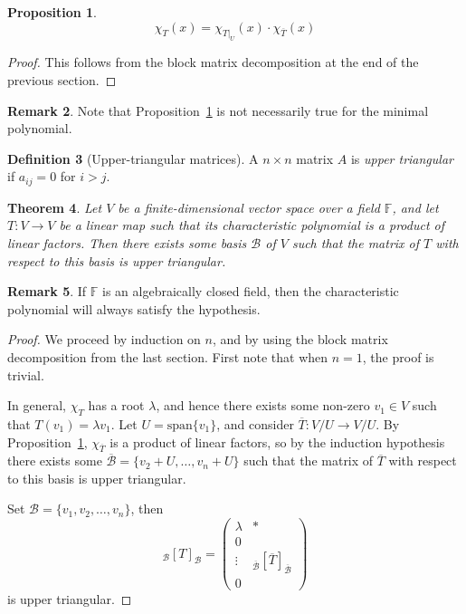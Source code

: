 \documentclass[10pt,fleqn]{article}
\newcommand{\spa}{\mathrm{span}}
\newcommand{\field}{\mathbb{F}}
\newcommand{\basis}{\mathcal{B}}
\theoremstyle{definition} \newtheorem{defn}{Definition}[section]
\theoremstyle{plain}      \newtheorem{thm}[defn]{Theorem}
\theoremstyle{plain}      \newtheorem{prop}[defn]{Proposition}
\theoremstyle{plain}      \newtheorem{lem}[defn]{Lemma}
\theoremstyle{plain}      \newtheorem{cor}[defn]{Corollary}
\theoremstyle{plain}      \newtheorem{ad}[defn]{Addendum}
\theoremstyle{definition} \newtheorem{ex}[defn]{Example}
\theoremstyle{definition} \newtheorem{rem}[defn]{Remark}
\numberwithin{equation}{subsection}
\begin{document}
\begin{prop}\label{char-pol-prod}
    \[
        \chi_T(x)=
        \chi_{T|_U}(x)\cdot\chi_{\overline{T}}(x)
    \]
\end{prop}

\begin{proof}
    This follows from the block matrix decomposition at the end of the previous section.
\end{proof}

\begin{rem}
    Note that Proposition~\ref{char-pol-prod} is not necessarily true for the minimal polynomial.
\end{rem}

\begin{defn}[Upper-triangular matrices]
    A $n\times n$ matrix $A$ is \emph{upper triangular} if $a_{ij}=0$ for $i>j$. 
\end{defn}

\begin{thm}\label{upp-tri-thm}
    Let $V$ be a finite-dimensional vector space over a field $\field$, and let $T:V\to V$ be a linear map such that its characteristic polynomial is a product of linear factors.
    Then there exists some basis $\basis$ of $V$ such that the matrix of $T$ with respect to this basis is upper triangular.
\end{thm}

\begin{rem}
    If $\field$ is an algebraically closed field, then the characteristic polynomial will always satisfy the hypothesis.
\end{rem}

\begin{proof}
    We proceed by induction on $n$, and by using the block matrix decomposition from the last section.
    First note that when $n=1$, the proof is trivial.

    In general, $\chi_T$ has a root $\lambda$, and hence there exists some non-zero $v_1\in V$ such that $T(v_1)=\lambda v_1$.
    Let $U=\spa\{v_1\}$, and consider $\overline{T}:V/U\to V/U$.
    By Proposition~\ref{char-pol-prod}, $\chi_{\overline{T}}$ is a product of linear factors, so by the induction hypothesis there exists some $\overline{\basis}=\{v_2+U,\ldots,v_n+U\}$ such that the matrix of $\overline{T}$ with respect to this basis is upper triangular.

    Set $\basis=\{v_1,v_2,\ldots,v_n\}$, then
    \[
        _{\basis}[T]_{\basis}=
        \left(
        \begin{array}{c|c}
            \lambda & *\\
            \hline
            0 & \\
            \vdots & _{\overline{\basis}}[\overline{T}]_{\overline{\basis}}\\
            0 &
        \end{array}
        \right)
    \]
    is upper triangular.
\end{proof}
\end{document}
